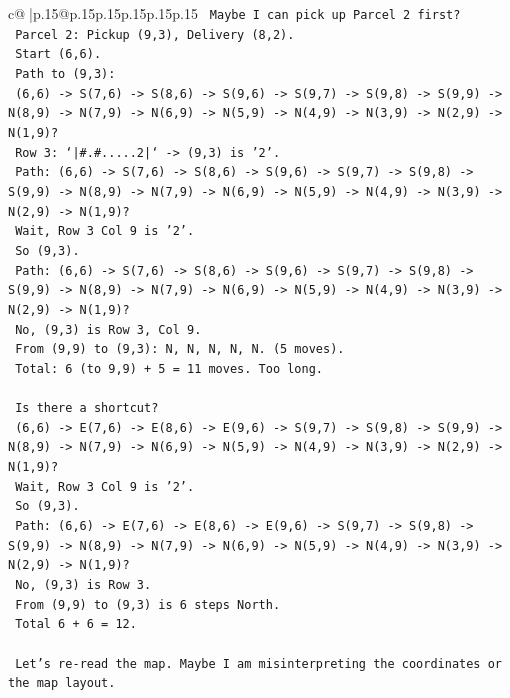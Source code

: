 \documentclass{article}
\begin{document}
{\begin{supertabular}{c@{$\;$}|p{.15\linewidth}@{}p{.15\linewidth}p{.15\linewidth}p{.15\linewidth}p{.15\linewidth}p{.15\linewidth}}
{{{\texttt{    Maybe I can pick up Parcel 2 first?} \\
\texttt{    Parcel 2: Pickup (9,3), Delivery (8,2).} \\
\texttt{    Start (6,6).} \\
\texttt{    Path to (9,3):} \\
\texttt{    (6,6) {-}> S(7,6) {-}> S(8,6) {-}> S(9,6) {-}> S(9,7) {-}> S(9,8) {-}> S(9,9) {-}> N(8,9) {-}> N(7,9) {-}> N(6,9) {-}> N(5,9) {-}> N(4,9) {-}> N(3,9) {-}> N(2,9) {-}> N(1,9)?} \\
\texttt{    Row 3: `|\#.\#.....2|` {-}> (9,3) is '2'.} \\
\texttt{    Path: (6,6) {-}> S(7,6) {-}> S(8,6) {-}> S(9,6) {-}> S(9,7) {-}> S(9,8) {-}> S(9,9) {-}> N(8,9) {-}> N(7,9) {-}> N(6,9) {-}> N(5,9) {-}> N(4,9) {-}> N(3,9) {-}> N(2,9) {-}> N(1,9)?} \\
\texttt{    Wait, Row 3 Col 9 is '2'.} \\
\texttt{    So (9,3).} \\
\texttt{    Path: (6,6) {-}> S(7,6) {-}> S(8,6) {-}> S(9,6) {-}> S(9,7) {-}> S(9,8) {-}> S(9,9) {-}> N(8,9) {-}> N(7,9) {-}> N(6,9) {-}> N(5,9) {-}> N(4,9) {-}> N(3,9) {-}> N(2,9) {-}> N(1,9)?} \\
\texttt{    No, (9,3) is Row 3, Col 9.} \\
\texttt{    From (9,9) to (9,3): N, N, N, N, N. (5 moves).} \\
\texttt{    Total: 6 (to 9,9) + 5 = 11 moves. Too long.} \\
\\ 
\texttt{    Is there a shortcut?} \\
\texttt{    (6,6) {-}> E(7,6) {-}> E(8,6) {-}> E(9,6) {-}> S(9,7) {-}> S(9,8) {-}> S(9,9) {-}> N(8,9) {-}> N(7,9) {-}> N(6,9) {-}> N(5,9) {-}> N(4,9) {-}> N(3,9) {-}> N(2,9) {-}> N(1,9)?} \\
\texttt{    Wait, Row 3 Col 9 is '2'.} \\
\texttt{    So (9,3).} \\
\texttt{    Path: (6,6) {-}> E(7,6) {-}> E(8,6) {-}> E(9,6) {-}> S(9,7) {-}> S(9,8) {-}> S(9,9) {-}> N(8,9) {-}> N(7,9) {-}> N(6,9) {-}> N(5,9) {-}> N(4,9) {-}> N(3,9) {-}> N(2,9) {-}> N(1,9)?} \\
\texttt{    No, (9,3) is Row 3.} \\
\texttt{    From (9,9) to (9,3) is 6 steps North.} \\
\texttt{    Total 6 + 6 = 12.} \\
\\ 
\texttt{    Let's re{-}read the map. Maybe I am misinterpreting the coordinates or the map layout.} \\
}}}
\end{supertabular}}
\end{document}
